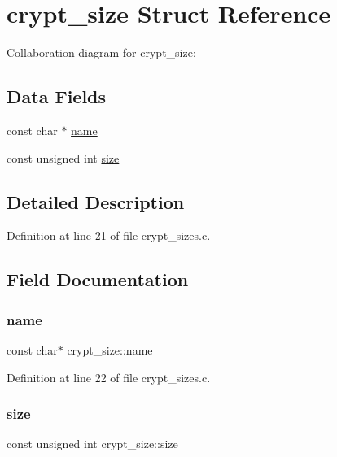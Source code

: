 \hypertarget{structcrypt__size}{}\section{crypt\+\_\+size Struct Reference}
\label{structcrypt__size}


Collaboration diagram for crypt\+\_\+size\+:
\subsection*{Data Fields}
\begin{DoxyCompactItemize}
\item 
const char $\ast$ \mbox{\hyperlink{structcrypt__size_a91ad85e7c4cf4d0d2b7b1e5df07f4fdd}{name}}
\item 
const unsigned int \mbox{\hyperlink{structcrypt__size_ab128ec1834486827ef888f52cb06abb6}{size}}
\end{DoxyCompactItemize}


\subsection{Detailed Description}


Definition at line 21 of file crypt\+\_\+sizes.\+c.



\subsection{Field Documentation}
\mbox{\label{structcrypt__size_a91ad85e7c4cf4d0d2b7b1e5df07f4fdd}} 
\subsubsection{\texorpdfstring{name}{name}}
{\footnotesize\ttfamily const char$\ast$ crypt\+\_\+size\+::name}



Definition at line 22 of file crypt\+\_\+sizes.\+c.

\mbox{\label{structcrypt__size_ab128ec1834486827ef888f52cb06abb6}} 
\subsubsection{\texorpdfstring{size}{size}}
{\footnotesize\ttfamily const unsigned int crypt\+\_\+size\+::size}



